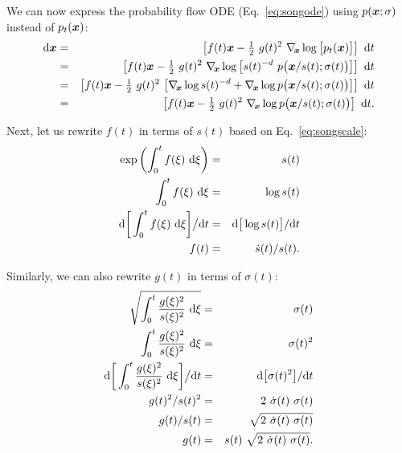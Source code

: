 We can now express the probability flow ODE (Eq.~\ref{eq:songode}) using $p(\boldsymbol{x}; \sigma)$ instead of $p_t(\boldsymbol{x})$:
\begin{eqnarray}
  \mathrm{d}\boldsymbol{x} &=& \left[ f(t) \boldsymbol{x} - \tfrac{1}{2} ~g(t)^2 ~\nabla_{\hspace{-0.5mm}\boldsymbol{x}} \log \big[ p_t(\boldsymbol{x}) \big] \right] ~\mathrm{d} t \\
  &=& \left[ f(t) \boldsymbol{x} - \tfrac{1}{2} ~g(t)^2 ~\nabla_{\hspace{-0.5mm}\boldsymbol{x}} \log \big[ s(t)^{-d} ~p\big( \boldsymbol{x} / s(t); \sigma(t) \big) \big] \right] ~\mathrm{d} t \\
  &=& \left[ f(t) \boldsymbol{x} - \tfrac{1}{2} ~g(t)^2 ~\big[ \nabla_{\hspace{-0.5mm}\boldsymbol{x}} \log s(t)^{-d} + \nabla_{\hspace{-0.5mm}\boldsymbol{x}} \log p\big( \boldsymbol{x} / s(t); \sigma(t) \big) \big] \right] ~\mathrm{d} t \\
  &=& \left[ f(t) \boldsymbol{x} - \tfrac{1}{2} ~g(t)^2 ~\nabla_{\hspace{-0.5mm}\boldsymbol{x}} \log p\big( \boldsymbol{x} / s(t); \sigma(t) \big) \right] ~\mathrm{d} t
  \label{eq:tempode}
  \text{.}
\end{eqnarray}

Next, let us rewrite $f(t)$ in terms of $s(t)$ based on Eq.~\ref{eq:songscale}:
\begin{eqnarray}
  \exp\left( \int_0^t f(\xi) ~\mathrm{d}\xi \right) &=& s(t) \\
  \int_0^t f(\xi) ~\mathrm{d}\xi &=& \log s(t) \\
  \mathrm{d} \bigg[ \int_0^t f(\xi) ~\mathrm{d}\xi \bigg] \big/ \mathrm{d} t &=& \mathrm{d} \big[ \log s(t) \big] / \mathrm{d} t \\
  f(t) &=& \dot s(t) / s(t)
  \label{eq:tempf}
  \text{.}
\end{eqnarray}

Similarly, we can also rewrite $g(t)$ in terms of $\sigma(t)$:
\begin{eqnarray}
  \sqrt{\int_0^t \frac{g(\xi)^2}{s(\xi)^2} ~\mathrm{d}\xi} &=& \sigma(t) \\
  \int_0^t \frac{g(\xi)^2}{s(\xi)^2} ~\mathrm{d}\xi &=& \sigma(t)^2 \\
  \mathrm{d} \bigg[ \int_0^t \frac{g(\xi)^2}{s(\xi)^2} ~\mathrm{d}\xi \bigg] \big/ \mathrm{d} t &=& \mathrm{d} \big[ \sigma(t)^2 \big] / \mathrm{d} t \\
  g(t)^2 / s(t)^2 &=& 2 ~\dot\sigma(t) ~\sigma(t) \\
  g(t) / s(t) &=& \sqrt{2 ~\dot\sigma(t) ~\sigma(t)} \\
  g(t) &=& s(t) ~\sqrt{2 ~\dot\sigma(t) ~\sigma(t)}
  \label{eq:tempg}
  \text{.}
\end{eqnarray}

